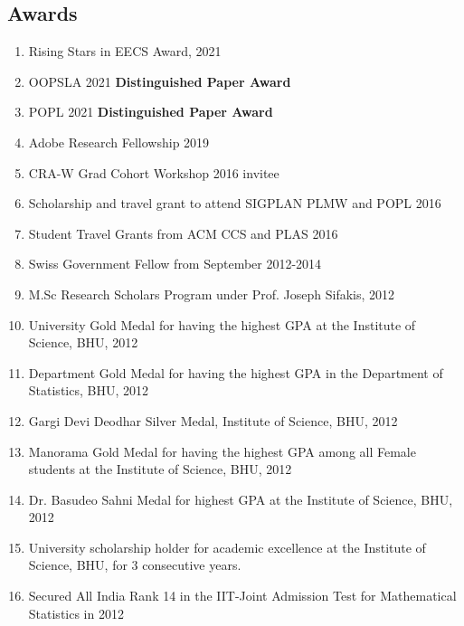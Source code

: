\documentclass[margin, 10pt]{res} %
\begin{document}
\begin{resume}
\section{Awards}
\begin{enumerate}[itemsep=.5pt]
\item Rising Stars in EECS Award, 2021
\item OOPSLA 2021 \textbf{Distinguished Paper Award}
\item POPL 2021 \textbf{Distinguished Paper Award}
\item Adobe Research Fellowship 2019
\item CRA-W Grad Cohort Workshop 2016 invitee
\item Scholarship and travel grant to attend SIGPLAN PLMW and POPL 2016
\item Student Travel Grants from ACM CCS and PLAS 2016
\item Swiss Government Fellow from September 2012-2014
\item M.Sc Research Scholars Program under Prof. Joseph Sifakis, 2012
\item University Gold Medal for having the highest GPA at the
  Institute of Science, BHU, 2012
\item Department Gold Medal for having the highest GPA in the Department of Statistics, BHU, 2012
\item Gargi Devi Deodhar Silver Medal, Institute of Science, BHU, 2012
\item Manorama Gold Medal for having the highest GPA among all Female students at the
  Institute of Science, BHU, 2012
\item Dr. Basudeo Sahni Medal for highest GPA at the
  Institute of Science, BHU, 2012
\item University scholarship holder for academic excellence at the Institute of Science, BHU,
  for 3 consecutive years.
\item Secured All India Rank 14 in the IIT-Joint Admission Test for Mathematical Statistics in 2012
\end{enumerate}


\end{resume}
\end{document}
